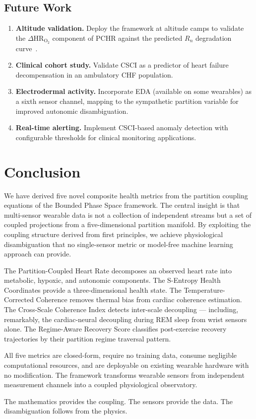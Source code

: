 \documentclass[10pt,twocolumn,a4paper]{article}
\theoremstyle{definition}
\begin{document}
\subsection{Future Work}

\begin{enumerate}[nosep]
\item \textbf{Altitude validation.} Deploy the framework at altitude
  camps to validate the $\Delta\text{HR}_{\text{O}_2}$ component of
  PCHR against the predicted $R_n$ degradation
  curve~\cite{sachikonye2024integration}.
\item \textbf{Clinical cohort study.} Validate CSCI as a predictor of
  heart failure decompensation in an ambulatory CHF population.
\item \textbf{Electrodermal activity.} Incorporate EDA (available on
  some wearables) as a sixth sensor channel, mapping to the sympathetic
  partition variable for improved autonomic disambiguation.
\item \textbf{Real-time alerting.} Implement CSCI-based anomaly
  detection with configurable thresholds for clinical monitoring
  applications.
\end{enumerate}

\section{Conclusion}
\label{sec:conclusion}

We have derived five novel composite health metrics from the partition
coupling equations of the Bounded Phase Space framework. The central
insight is that multi-sensor wearable data is not a collection of
independent streams but a set of coupled projections from a
five-dimensional partition manifold. By exploiting the coupling
structure derived from first principles, we achieve physiological
disambiguation that no single-sensor metric or model-free machine
learning approach can provide.

The Partition-Coupled Heart Rate decomposes an observed heart rate into
metabolic, hypoxic, and autonomic components. The S-Entropy Health
Coordinates provide a three-dimensional health state. The
Temperature-Corrected Coherence removes thermal bias from cardiac
coherence estimation. The Cross-Scale Coherence Index detects
inter-scale decoupling --- including, remarkably, the cardiac-neural
decoupling during REM sleep from wrist sensors alone. The Regime-Aware
Recovery Score classifies post-exercise recovery trajectories by their
partition regime traversal pattern.

All five metrics are closed-form, require no training data, consume
negligible computational resources, and are deployable on existing
wearable hardware with no modification. The framework transforms
wearable sensors from independent measurement channels into a coupled
physiological observatory.

The mathematics provides the coupling. The sensors provide the data.
The disambiguation follows from the physics.



\end{document}
